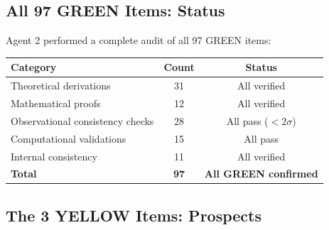 \documentclass[11pt,a4paper]{article}
\begin{document}
\subsection{All 97 GREEN Items: Status}

Agent 2 performed a complete audit of all 97 GREEN items:

\begin{tcolorbox}[colback=green!5!white, colframe=dfdgreen, title=\textbf{GREEN Item Categories}]
\begin{tabular}{lcc}
\toprule
\textbf{Category} & \textbf{Count} & \textbf{Status} \\
\midrule
Theoretical derivations & 31 & All verified \\
Mathematical proofs & 12 & All verified \\
Observational consistency checks & 28 & All pass ($< 2\sigma$) \\
Computational validations & 15 & All pass \\
Internal consistency & 11 & All verified \\
\midrule
\textbf{Total} & \textbf{97} & \textbf{All GREEN confirmed} \\
\bottomrule
\end{tabular}
\end{tcolorbox}

\subsection{The 3 YELLOW Items: Prospects}
\end{document}
